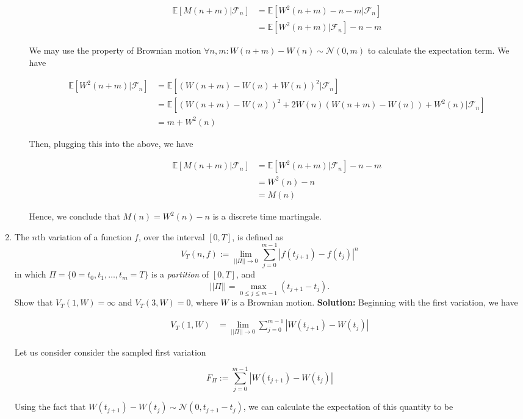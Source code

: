 \documentclass[12pt, a4paper]{article}
\begin{document}
\begin{enumerate}
\begin{enumerate}
    \begin{align*}
        \mathbb{E}[M(n+m)|\mathcal{F}_{n}] &= \mathbb{E}[W^2(n+m)-n-m|\mathcal{F}_{n}] \\&= \mathbb{E}[W^2(n+m)|\mathcal{F}_n]-n-m
    \end{align*}

    We may use the property of Brownian motion $\forall n, m: W(n+m)-W(n) \sim \mathcal{N}(0, m)$ to calculate the expectation term. We have

    \begin{align*}
        \mathbb{E}[W^2(n+m)|\mathcal{F}_n] &= \mathbb{E}[(W(n+m)-W(n)+W(n))^2|\mathcal{F}_n]\\ &= \mathbb{E}[(W(n+m)-W(n))^2 + 2W(n)(W(n+m)-W(n)) + W^2(n)|\mathcal{F}_n] \\&= m + W^2(n)
    \end{align*}

    Then, plugging this into the above, we have

    \begin{align*}
        \mathbb{E}[M(n+m)|\mathcal{F}_{n}] &= \mathbb{E}[W^2(n+m)|\mathcal{F}_n]-n-m \\ &= W^2(n)-n\\&= M(n)
    \end{align*}

    Hence, we conclude that $M(n) = W^2(n)-n$ is a discrete time martingale.
    
\end{enumerate}

\item The $n$th variation of a function $f$, over the interval $[0,T]$, is defined as $$V_T(n,f):= \lim_{|| \Pi ||\rightarrow 0} \sum_{j=0}^{m-1}\left| f(t_{j+1})-f(t_j) \right|^n$$ in which $\Pi=\{0=t_0, t_1, \dots, t_m=T\}$
is a \textit{partition} of $[0,T]$, and $$||\Pi||=\max_{0 \le j \le m-1} (t_{j+1}-t_j).$$
Show that $V_T(1,W)=\infty$ and $V_T(3,W)=0$, where $W$ is a Brownian motion.
\textbf{Solution:} Beginning with the first variation, we have 

\begin{align*}
    V_T(1,W) &= \lim_{||\Pi||\rightarrow 0} \sum_{j=0}^{m-1} |W(t_{j+1})-W(t_{j})|
\end{align*}

Let us consider consider the sampled first variation 

$$F_\Pi := \sum_{j=0}^{m-1}|W(t_{j+1})-W(t_{j})|$$

Using the fact that $W(t_{j+1})-W(t_{j}) \sim \mathcal{N}(0, t_{j+1}-t_j)$, we can calculate the expectation of this quantity to be 


\end{enumerate}
\end{document}
